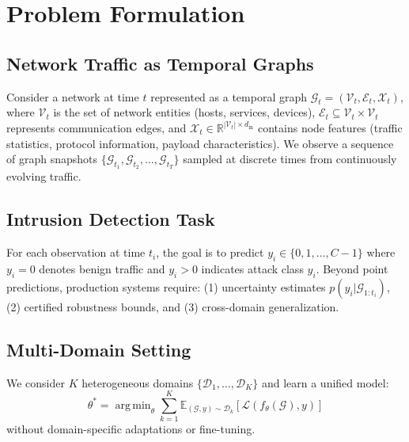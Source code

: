 \documentclass[10pt,journal,compsoc]{IEEEtran}
\newcommand{\R}{\mathbb{R}}
\newcommand{\E}{\mathbb{E}}
\newcommand{\G}{\mathcal{G}}
\newcommand{\D}{\mathcal{D}}
\newcommand{\X}{\mathcal{X}}
\newcommand{\V}{\mathcal{V}}
\DeclareMathOperator*{\argmin}{arg\,min}
\begin{document}
\vspace{-0.2cm}
\section{Problem Formulation}
\label{sec:problem}

\vspace{-0.2cm}
\subsection{Network Traffic as Temporal Graphs}

Consider a network at time $t$ represented as a temporal graph $\G_t = (\V_t, \mathcal{E}_t, \X_t)$, where $\V_t$ is the set of network entities (hosts, services, devices), $\mathcal{E}_t \subseteq \V_t \times \V_t$ represents communication edges, and $\X_t \in \R^{|\V_t| \times d_{\text{in}}}$ contains node features (traffic statistics, protocol information, payload characteristics). We observe a sequence of graph snapshots $\{\G_{t_1}, \G_{t_2}, \ldots, \G_{t_T}\}$ sampled at discrete times from continuously evolving traffic.

\vspace{-0.2cm}
\subsection{Intrusion Detection Task}

For each observation at time $t_i$, the goal is to predict $y_i \in \{0, 1, \ldots, C-1\}$ where $y_i = 0$ denotes benign traffic and $y_i > 0$ indicates attack class $y_i$. Beyond point predictions, production systems require: (1) uncertainty estimates $p(y_i | \G_{1:t_i})$, (2) certified robustness bounds, and (3) cross-domain generalization.

\vspace{-0.2cm}
\subsection{Multi-Domain Setting}

We consider $K$ heterogeneous domains $\{\D_1, \ldots, \D_K\}$ and learn a unified model:
\begin{equation}
\theta^* = \argmin_\theta \sum_{k=1}^K \E_{(\G, y) \sim \D_k} [\mathcal{L}(f_\theta(\G), y)]
\end{equation}
without domain-specific adaptations or fine-tuning.
\end{document}
